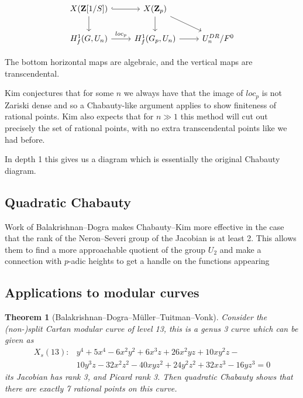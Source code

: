 \documentclass[oneside,11pt,]{article}
\newtheorem{theorem}{Theorem}
\let\emph\relax %
\begin{document}
\[\begin{tikzcd}
    {X(\mathbf Z[1/S])} & {X(\mathbf Z_p)} \\
    {H^1_f(G,U_n)} & {H_f^1(G_p, U_n)} & {U_n^{DR}/F^0}
	\arrow[hook, from=1-1, to=1-2]
	\arrow[from=1-1, to=2-1]
	\arrow[from=1-2, to=2-2]
    \arrow["loc_p",from=2-1, to=2-2]{loc_p}
	\arrow[from=1-2, to=2-3]
	\arrow[from=2-2, to=2-3]
\end{tikzcd}\]

The bottom horizontal maps are algebraic, and the vertical maps are transcendental.

Kim conjectures that for some \emph{depth} $n$ we always have that the image of $loc_p$ is not Zariski dense and so a Chabauty-like argument applies to show finiteness of rational points.
Kim also expects that for $n \gg 1$ this method will cut out precisely the set of rational points, with no extra transcendental points like we had before.

In depth 1 this gives us a diagram which is essentially the original Chabauty diagram.


\subsection{Quadratic Chabauty}
Work of Balakrishnan--Dogra makes Chabauty--Kim more effective in the case that the rank of the Neron--Severi group of the Jacobian is at least 2.
This allows them to find a more approachable quotient of the group $U_2$ and make a connection with $p$-adic heights to get a handle on the functions appearing


\subsection{Applications to modular curves}
\begin{theorem}[Balakrishnan–Dogra–M\"uller–Tuitman–Vonk]
    Consider the (non-)split Cartan modular curve of level 13, this is a genus 3 curve which can be given as
    \[\begin{aligned}
        X_s (13) \colon  &y^{4}+5 x^{4}-6 x^{2} y^{2}+6 x^{3} z+26 x^{2} y z+10 x y^{2} z- \\
&10 y^{3} z-32 x^{2} z^{2}-40 x y z^{2}+24 y^{2} z^{2}+32 x z^{3}-16 y z^{3}=0
    \end{aligned}\]
its Jacobian has rank 3, and Picard rank 3.
Then quadratic Chabauty shows that there are exactly 7 rational points on this curve.
\end{theorem}
\end{document}
